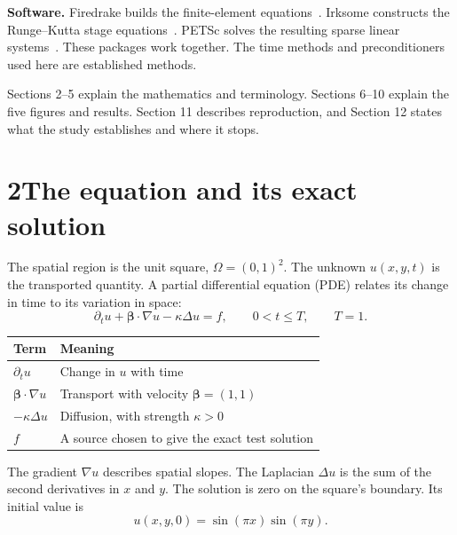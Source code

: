 \documentclass[11pt,a4paper]{article}
\begin{document}
\textbf{Software.} Firedrake builds the finite-element equations~\cite{firedrake}. Irksome constructs the Runge--Kutta stage equations~\cite{irksome,extending}. PETSc solves the resulting sparse linear systems~\cite{petscgmres,petscasm}. These packages work together. The time methods and preconditioners used here are established methods.

Sections 2--5 explain the mathematics and terminology. Sections 6--10 explain the five figures and results. Section 11 describes reproduction, and Section 12 states what the study establishes and where it stops.

\newpage
\section*{2\quad The equation and its exact solution}
The spatial region is the unit square, $\Omega=(0,1)^2$. The unknown $u(x,y,t)$ is the transported quantity. A partial differential equation (PDE) relates its change in time to its variation in space:
\begin{equation}
\partial_tu+\boldsymbol\beta\cdot\nabla u-\kappa\Delta u=f,
\qquad 0<t\leq T,\qquad T=1.
\end{equation}
\begin{center}\begin{tabular}{ll}\toprule
Term & Meaning\\\midrule
$\partial_tu$ & Change in $u$ with time\\
$\boldsymbol\beta\cdot\nabla u$ & Transport with velocity $\boldsymbol\beta=(1,1)$\\
$-\kappa\Delta u$ & Diffusion, with strength $\kappa>0$\\
$f$ & A source chosen to give the exact test solution\\\bottomrule
\end{tabular}\end{center}
The gradient $\nabla u$ describes spatial slopes. The Laplacian $\Delta u$ is the sum of the second derivatives in $x$ and $y$. The solution is zero on the square's boundary. Its initial value is
\begin{equation}
u(x,y,0)=\sin(\pi x)\sin(\pi y).
\end{equation}
\end{document}
